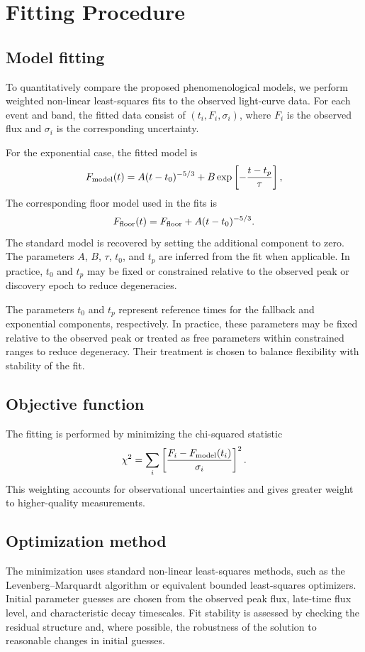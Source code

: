 \documentclass[11pt]{article}
\begin{document}
\section{Fitting Procedure}
\subsection{Model fitting}
To quantitatively compare the proposed phenomenological models, we perform weighted non-linear least-squares fits to the observed light-curve data. For each event and band, the fitted data consist of $(t_i,F_i,\sigma_i)$, where $F_i$ is the observed flux and $\sigma_i$ is the corresponding uncertainty.

For the exponential case, the fitted model is
\begin{equation}
F_{\rm model}(t)=A(t-t_0)^{-5/3}+B\exp\left[-\frac{t-t_p}{\tau}\right],
\end{equation}
The corresponding floor model used in the fits is
\begin{equation}
F_{\rm floor}(t)=F_{\rm floor}+A(t-t_0)^{-5/3}.
\end{equation}
The standard model is recovered by setting the additional component to zero. The parameters $A$, $B$, $\tau$, $t_0$, and $t_p$ are inferred from the fit when applicable. In practice, $t_0$ and $t_p$ may be fixed or constrained relative to the observed peak or discovery epoch to reduce degeneracies.

The parameters $t_0$ and $t_p$ represent reference times for the fallback and exponential components, respectively. In practice, these parameters may be fixed relative to the observed peak or treated as free parameters within constrained ranges to reduce degeneracy. Their treatment is chosen to balance flexibility with stability of the fit.


\subsection{Objective function}
The fitting is performed by minimizing the chi-squared statistic
\begin{equation}
\chi^2=\sum_i \left[\frac{F_i-F_{\rm model}(t_i)}{\sigma_i}\right]^2.
\end{equation}
This weighting accounts for observational uncertainties and gives greater weight to higher-quality measurements.

\subsection{Optimization method}
The minimization uses standard non-linear least-squares methods, such as the Levenberg--Marquardt algorithm or equivalent bounded least-squares optimizers. Initial parameter guesses are chosen from the observed peak flux, late-time flux level, and characteristic decay timescales. Fit stability is assessed by checking the residual structure and, where possible, the robustness of the solution to reasonable changes in initial guesses.
\end{document}
